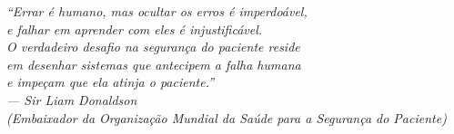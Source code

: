 \begin{epigrafe}[]
    \vspace*{\fill}
	\begin{flushright}
		\textit{``Errar é humano, mas ocultar os erros é imperdoável,\\
		e falhar em aprender com eles é injustificável.\\
		O verdadeiro desafio na segurança do paciente reside\\
		em desenhar sistemas que antecipem a falha humana\\
		e impeçam que ela atinja o paciente.''\\[0.5em]
		— Sir Liam Donaldson\\
		(Embaixador da Organização Mundial da Saúde para a Segurança do Paciente)}
	\end{flushright}
\end{epigrafe}